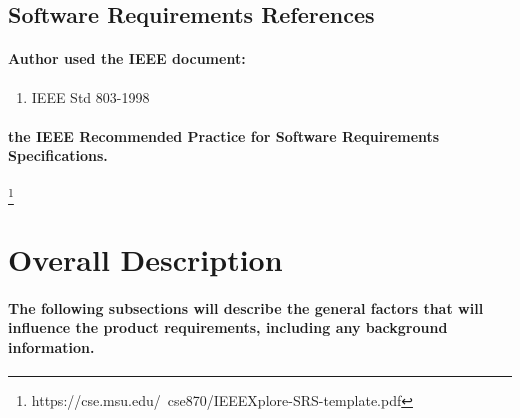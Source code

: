 \subsection{Software Requirements References}
%
\paragraph{Author used the IEEE document:}
\begin{enumerate}
\item IEEE Std 803-1998
\end{enumerate}
\paragraph{the IEEE Recommended Practice for Software Requirements Specifications.}\footnote{https://cse.msu.edu/~cse870/IEEEXplore-SRS-template.pdf}


\section{Overall Description}
\paragraph{The following subsections will describe the general factors that will influence the product requirements, including any background information.}
 
